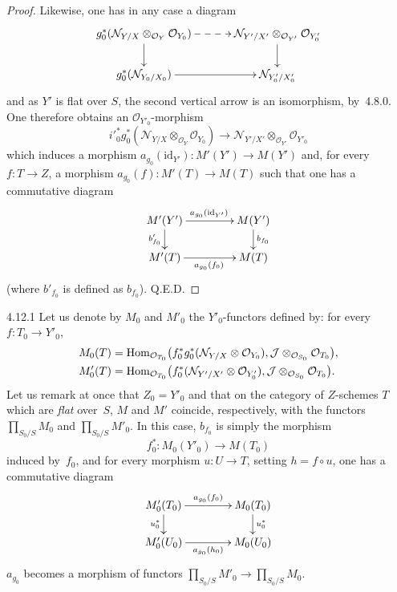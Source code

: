 \begin{proof}
Likewise, one has in any case a diagram
\[
\xymatrix@C=3.2em@R=1.9em{
g_0^*(\mathcal{N}_{Y/X}\otimes_{\mathcal{O}_Y}\mathcal{O}_{Y_0})
  \ar@{-->}[r] \ar[d]
& \mathcal{N}_{Y'/X'}\otimes_{\mathcal{O}_{Y'}}\mathcal{O}_{Y'_0} \ar[d] \\
g_0^*(\mathcal{N}_{Y_0/X_0}) \ar[r]
& \mathcal{N}_{Y'_0/X'_0}
}
\]
and as \(Y'\) is flat over \(S\), the second vertical arrow is an
isomorphism, by~4.8.0. One therefore obtains an
\(\mathcal{O}_{Y'_0}\)-morphism
\[
i'^*_0 g^*_0(\mathcal{N}_{Y/X}\otimes_{\mathcal{O}_Y}\mathcal{O}_{Y_0})
\longrightarrow
\mathcal{N}_{Y'/X'}\otimes_{\mathcal{O}_{Y'}}\mathcal{O}_{Y'_0}
\]
which induces a morphism
\(a_{g_0}(\mathrm{id}_{Y'})\colon M'(Y')\to M(Y')\) and, for every
\(f\colon T\to Z\), a morphism
\(a_{g_0}(f)\colon M'(T)\to M(T)\) such that one has a commutative diagram
\[
\xymatrix@C=4.2em@R=1.7em{
M'(Y') \ar[r]^{a_{g_0}(\mathrm{id}_{Y'})} \ar[d]_{b'_{f_0}}
& M(Y') \ar[d]^{b_{f_0}} \\
M'(T) \ar[r]_{a_{g_0}(f_0)}
& M(T)
}
\]
(where \(b'_{f_0}\) is defined as \(b_{f_0}\)).
\hfill Q.E.D.
\end{proof}

\begin{remark}{4.12.1}\label{III.4.12.1}
{\renewcommand{\thefootnote}{(103)}}%
Let us denote by \(M_0\) and \(M'_0\) the \(Y'_0\)-functors defined by: for
every \(f\colon T_0\to Y'_0\),
\[
\begin{aligned}
M_0(T)
&=\operatorname{Hom}_{\mathcal{O}_{T_0}}\bigl(
f^*_0 g^*_0(\mathcal{N}_{Y/X}\otimes\mathcal{O}_{Y_0}),
\mathcal{J}\otimes_{\mathcal{O}_{S_0}}\mathcal{O}_{T_0}\bigr),\\
M'_0(T)
&=\operatorname{Hom}_{\mathcal{O}_{T_0}}\bigl(
f^*_0(\mathcal{N}_{Y'/X'}\otimes\mathcal{O}_{Y'_0}),
\mathcal{J}\otimes_{\mathcal{O}_{S_0}}\mathcal{O}_{T_0}\bigr).
\end{aligned}
\]
Let us remark at once that \(Z_0=Y'_0\) and that on the category of
\(Z\)-schemes \(T\) which are \emph{flat} over~\(S\), \(M\) and \(M'\)
coincide, respectively, with the functors
\(\prod_{S_0/S}M_0\) and \(\prod_{S_0/S}M'_0\). In this case, \(b_{f_0}\)
is simply the morphism
\[
f_0^*\colon M_0(Y'_0)\longrightarrow M(T_0)
\]
induced by~\(f_0\), and for every morphism \(u\colon U\to T\), setting
\(h=f\circ u\), one has a commutative diagram
\[
\xymatrix@C=4em@R=1.7em{
M'_0(T_0) \ar[r]^{a_{g_0}(f_0)} \ar[d]_{u_0^*}
& M_0(T_0) \ar[d]^{u_0^*} \\
M'_0(U_0) \ar[r]_{a_{g_0}(h_0)}
& M_0(U_0)
}
\]
\ie \(a_{g_0}\) becomes a morphism of functors
\(\prod_{S_0/S}M'_0\to\prod_{S_0/S}M_0\).
\end{remark}

